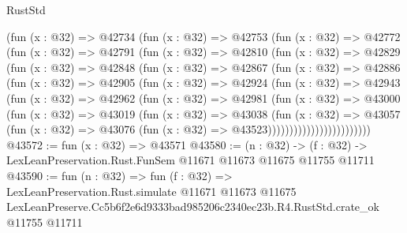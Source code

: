 \begin{lexlean}{RustStd}
\begin{coremodule}
            (fun (x : @32) =>
            @42734
              (fun (x : @32) =>
              @42753
                (fun (x : @32) =>
                @42772
                  (fun (x : @32) =>
                  @42791
                    (fun (x : @32) =>
                    @42810
                      (fun (x : @32) =>
                      @42829
                        (fun (x : @32) =>
                        @42848
                          (fun (x : @32) =>
                          @42867
                            (fun (x : @32) =>
                            @42886
                              (fun (x : @32) =>
                              @42905
                                (fun (x : @32) =>
                                @42924
                                  (fun (x : @32) =>
                                  @42943
                                    (fun (x : @32) =>
                                    @42962
                                      (fun (x : @32) =>
                                      @42981
                                        (fun (x : @32) =>
                                        @43000
                                          (fun (x : @32) =>
                                          @43019
                                            (fun (x : @32) =>
                                            @43038
                                              (fun (x : @32) =>
                                              @43057
                                                (fun (x : @32) =>
                                                @43076
                                                  (fun (x : @32) => @43523))))))))))))))))))))))))
@43572 := fun (x : @32) => @43571
@43580 := (n : @32) ->
  (f : @32) -> LexLeanPreservation.Rust.FunSem @11671 @11673 @11675 @11755 @11711
@43590 := fun (n : @32) =>
  fun (f : @32) =>
  LexLeanPreservation.Rust.simulate
    @11671
    @11673
    @11675
    LexLeanPreserve.Cc5b6f2e6d9333bad985206c2340ec23b.R4.RustStd.crate_ok
    @11755
    @11711
\end{coremodule}
\end{lexlean}
